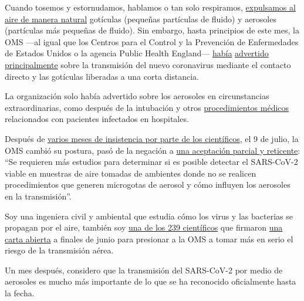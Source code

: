 Cuando tosemos y estornudamos, hablamos o tan solo respiramos,
\href{https://www.sciencedirect.com/science/article/pii/S0021850211001200}{expulsamos
al aire de manera natural} gotículas (pequeñas partículas de fluido) y
aerosoles (partículas más pequeñas de fluido). Sin embargo, hasta
principios de este mes, la OMS ---al igual que los Centros para el
Control y la Prevención de Enfermedades de Estados Unidos o la agencia
Public Health England---
\href{https://www.who.int/news-room/commentaries/detail/modes-of-transmission-of-virus-causing-covid-19-implications-for-ipc-precaution-recommendations}{había}
\href{https://www.who.int/news-room/commentaries/detail/modes-of-transmission-of-virus-causing-covid-19-implications-for-ipc-precaution-recommendations}{advertido
principalmente} sobre la transmisión del nuevo coronavirus mediante el
contacto directo y las gotículas liberadas a una corta distancia.

La organización solo había advertido sobre los aerosoles en
circunstancias extraordinarias, como después de la intubación y otros
\href{https://www.who.int/publications/i/item/WHO-2019-nCoV-IPC-2020.4}{procedimientos
médicos} relacionados con pacientes infectados en hospitales.

Después de
\href{https://www.nature.com/articles/d41586-020-00974-w\#ref-CR5}{varios
meses de insistencia por parte de los científicos}, el 9 de julio, la
OMS cambió su postura, pasó de la negación a
\href{https://www.who.int/news-room/commentaries/detail/transmission-of-sars-cov-2-implications-for-infection-prevention-precautions}{una
aceptación parcial y reticente}: ``Se requieren más estudios para
determinar si es posible detectar el SARS-CoV-2 viable en muestras de
aire tomadas de ambientes donde no se realicen procedimientos que
generen microgotas de aerosol y cómo influyen los aerosoles en la
transmisión''.

Soy una ingeniera civil y ambiental que estudia cómo los virus y las
bacterias se propagan por el aire, también soy
\href{https://www.nytimes.com/es/2020/07/06/espanol/ciencia-y-tecnologia/coronavirus-transmision-aire.html}{una
de los 239 científicos} que firmaron
\href{https://academic.oup.com/cid/article/doi/10.1093/cid/ciaa939/5867798}{una
carta abierta} a finales de junio para presionar a la OMS a tomar más en
serio el riesgo de la transmisión aérea.

Un mes después, considero que la transmisión del SARS-CoV-2 por medio de
aerosoles es mucho más importante de lo que se ha reconocido
oficialmente hasta la fecha.

